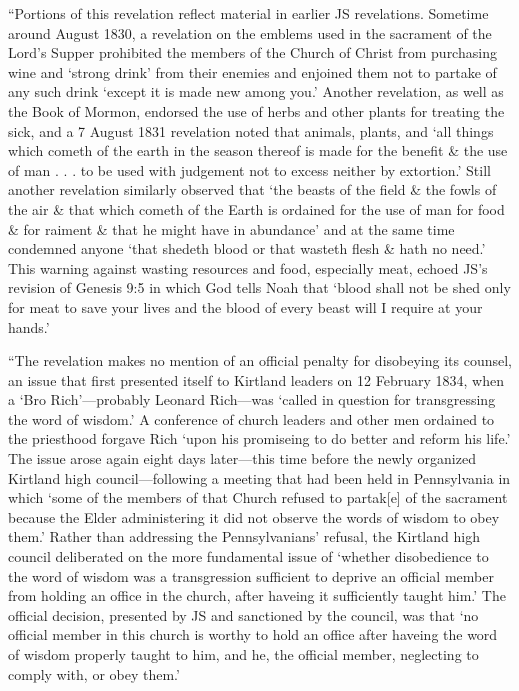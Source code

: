 			``Portions of this revelation reflect material in earlier JS revelations. Sometime around August 1830, a revelation on the emblems used in the sacrament of the Lord's Supper prohibited the members of the Church of Christ from purchasing wine and `strong drink' from their enemies and enjoined them not to partake of any such drink `except it is made new among you.' Another revelation, as well as the Book of Mormon, endorsed the use of herbs and other plants for treating the sick, and a 7 August 1831 revelation noted that animals, plants, and `all things which cometh of the earth in the season thereof is made for the benefit \& the use of man . . . to be used with judgement not to excess neither by extortion.' Still another revelation similarly observed that `the beasts of the field \& the fowls of the air \& that which cometh of the Earth is ordained for the use of man for food \& for raiment \& that he might have in abundance' and at the same time condemned anyone `that shedeth blood or that wasteth flesh \& hath no need.' This warning against wasting resources and food, especially meat, echoed JS's revision of Genesis 9:5 in which God tells Noah that `blood shall not be shed only for meat to save your lives and the blood of every beast will I require at your hands.'
			
			``The revelation makes no mention of an official penalty for disobeying its counsel, an issue that first presented itself to Kirtland leaders on 12 February 1834, when a `Bro Rich'---probably Leonard Rich---was `called in question for transgressing the word of wisdom.' A conference of church leaders and other men ordained to the priesthood forgave Rich `upon his promiseing to do better and reform his life.' The issue arose again eight days later---this time before the newly organized Kirtland high council---following a meeting that had been held in Pennsylvania in which `some of the members of that Church refused to partak[e] of the sacrament because the Elder administering it did not observe the words of wisdom to obey them.' Rather than addressing the Pennsylvanians' refusal, the Kirtland high council deliberated on the more fundamental issue of `whether disobedience to the word of wisdom was a transgression sufficient to deprive an official member from holding an office in the church, after haveing it sufficiently taught him.' The official decision, presented by JS and sanctioned by the council, was that `no official member in this church is worthy to hold an office after haveing the word of wisdom properly taught to him, and he, the official member, neglecting to comply with, or obey them.'

